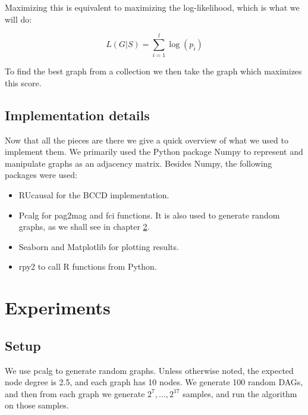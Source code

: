 \documentclass[11pt,a4paper]{report}
\theoremstyle{definition}
\begin{document}
Maximizing this is equivalent to maximizing the log-likelihood, which is
what we will do:

\begin{equation*}
  L(G|S) = \sum_{i=1}^l \log (p_i)
\end{equation*}

To find the best graph from a collection we then take the graph which
maximizes this score.

\section{Implementation details}
Now that all the pieces are there we give a quick overview of what we used
to implement them. We primarily used the Python package Numpy
\cite{harrisArrayProgrammingNumPy2020} to represent and manipulate graphs
as an adjacency matrix. Besides Numpy, the following packages were used:

\begin{itemize}
  \item RUcausal  for the BCCD implementation.

  \item Pcalg\cite{kalischCausalInferenceUsing2012} for pag2mag and fci
    functions. It is also used to generate random graphs, as we shall see
    in chapter \ref{results}.

  \item Seaborn\cite{waskomSeabornStatisticalData2021} and
    Matplotlib\cite{hunterMatplotlib2DGraphics2007} for plotting results.

  \item rpy2 to call R functions from Python.
\end{itemize}

\chapter{Experiments}\label{results}

\section{Setup}
We use pcalg to generate random graphs. Unless otherwise noted, the
expected node degree is 2.5, and each graph has 10 nodes. We generate 100
random DAGs, and then from each graph we generate $2^7, \ldots, 2^{17}$
samples, and run the algorithm on those samples.
\end{document}
